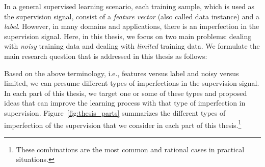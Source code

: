 In a general supervised learning scenario, each training sample, which is used as the supervision signal, consist of a \emph{feature vector} (also called data instance) and a \emph{label}. However, in many domains and applications, there is an imperfection in the supervision signal. Here, in this thesis, we focus on two main problems: dealing with \emph{noisy} training data and dealing with \emph{limited} training data. 
We formulate the main research question that is addressed in this thesis as follows:

Based on the above terminology, i.e., features versus label and noisy versus limited, we can presume different types of imperfections in the supervision signal. In each part of this thesis, we target one or some of these types and proposed ideas that can improve the learning process with that type of imperfection in supervision. 
Figure~\ref{fig:thesis_parts} summarizes the different types of imperfection of the supervision that we consider in each part of this thesis.\footnote{These combinations are the most common and rational cases in practical situations.}
